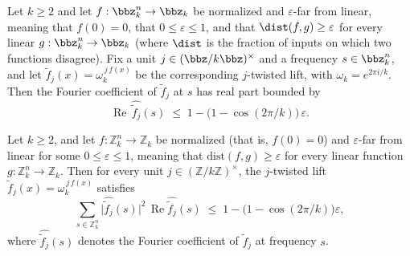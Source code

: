 \begin{lemma}
\label{ZkBLR.re_fourier_coeff_lift_omega_j_unit_bound}
\leanok
{}
Let $k \ge 2$ and let $f : \bbz_k^n \to \bbz_k$ be normalized and $\varepsilon$-far from
linear, meaning that $f(0) = 0$, that $0 \le \varepsilon \le 1$, and that $\dist(f,g)
\ge \varepsilon$ for every linear $g : \bbz_k^n \to \bbz_k$ (where $\dist$ is the
fraction of inputs on which two functions disagree). Fix a unit $j \in
(\bbz/k\bbz)^\times$ and a frequency $s \in \bbz_k^n$, and let $\widetilde{f}_j(x) =
\omega_k^{\,j\,f(x)}$ be the corresponding $j$-twisted lift, with $\omega_k = e^{2\pi
i/k}$. Then the Fourier coefficient of $\widetilde{f}_j$ at $s$ has real part bounded by
\[
\operatorname{Re}\,\widehat{\widetilde{f}_j}(s) \;\le\; 1 - \bigl(1 -
\cos(2\pi/k)\bigr)\,\varepsilon .
\]
\end{lemma}

\begin{lemma}
\label{ZkBLR.weighted_sum_unit_bound}
\leanok
{}
Let $k \ge 2$, and let $f : \mathbb{Z}_k^n \to \mathbb{Z}_k$ be normalized (that is,
$f(0) = 0$) and $\varepsilon$-far from linear for some $0 \le \varepsilon \le 1$,
meaning that $\mathrm{dist}(f,g) \ge \varepsilon$ for every linear function $g :
\mathbb{Z}_k^n \to \mathbb{Z}_k$. Then for every unit $j \in
(\mathbb{Z}/k\mathbb{Z})^\times$, the $j$-twisted lift $\widetilde{f}_j(x) =
\omega_k^{\,j\,f(x)}$ satisfies
\[
  \sum_{s \in \mathbb{Z}_k^n}
    \bigl|\widehat{\widetilde{f}_j}(s)\bigr|^2 \,
    \operatorname{Re}\widehat{\widetilde{f}_j}(s)
  \;\le\; 1 - \bigl(1 - \cos(2\pi/k)\bigr)\varepsilon,
\]
where $\widehat{\widetilde{f}_j}(s)$ denotes the Fourier coefficient of
$\widetilde{f}_j$ at frequency $s$.
\end{lemma}

